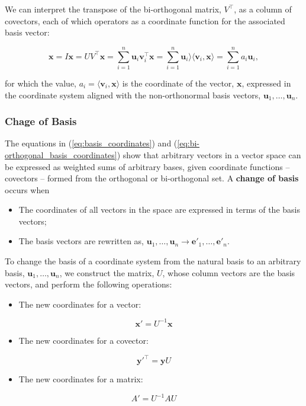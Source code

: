 \documentclass[12pt, twoside, draft]{article}
\begin{document}
We can interpret the transpose of the bi-orthogonal matrix, $V^\top$, as a column of covectors, each of which operators as a coordinate function for the associated basis vector:

\begin{equation}\label{eq:bi-orthogonal_basis_coordinates}
\mathbf{x} = I \mathbf{x} = UV^\top \mathbf{x} = \sum_{i=1}^n \mathbf{u}_i \mathbf{v}_i^\top \mathbf{x} = \sum_{i=1}^n \mathbf{u}_i \rangle \langle \mathbf{v}_i, \mathbf{x} \rangle = \sum_{i=1}^n a_i \mathbf{u}_i,
\end{equation}

for which the value, $a_i = \langle \mathbf{v}_i, \mathbf{x} \rangle$ is the coordinate of the vector, $\mathbf{x}$, expressed in the coordinate system aligned with the non-orthonormal basis vectors, $\mathbf{u}_1, \ldots, \mathbf{u}_n$.

\subsubsection{Chage of Basis}\label{sec:change_of_basis}
The equations in (\ref{eq:basis_coordinates}) and (\ref{eq:bi-orthogonal_basis_coordinates}) show that arbitrary vectors in a vector space can be expressed as weighted sums of arbitrary bases, given coordinate functions -- covectors -- formed from the orthogonal or bi-orthogonal set.  A \textbf{change of basis} occurs when
\begin{itemize}[noitemsep]
\item The coordinates of all vectors in the space are expressed in terms of the basis vectors;
\item The basis vectors are rewritten as, $\mathbf{u}_1, \ldots, \mathbf{u}_n \rightarrow \mathbf{e}'_1, \ldots, \mathbf{e}'_n$.
\end{itemize}

To change the basis of a coordinate system from the natural basis to an arbitrary basis, $\mathbf{u}_1, \ldots, \mathbf{u}_n$, we construct the matrix, $U$, whose column vectors are the basis vectors, and perform the following operations:
\begin{itemize}
\item The new coordinates for a vector:
\end{itemize}
\begin{equation}\label{eq:basis_change_vector}
\mathbf{x}' = U^{-1} \mathbf{x}
\end{equation}
\begin{itemize}
\item The new coordinates for a covector:
\end{itemize}
\begin{equation}\label{eq:basis_change_covector}
\mathbf{y}'^{\top} = \mathbf{y} U
\end{equation}
\begin{itemize}
\item The new coordinates for a matrix:
\end{itemize}
\begin{equation}\label{eq:basis_change_matrix}
A' = U^{-1}AU
\end{equation}
\end{document}

